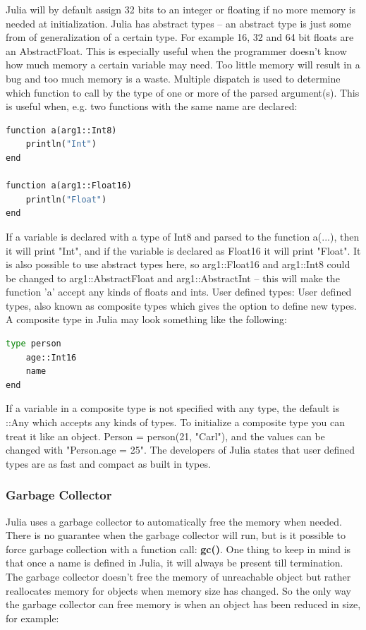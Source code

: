 \documentclass[a4paper,11pt]{article}
\begin{document}
Julia will by default assign 32 bits to an integer or floating if no more memory is needed at initialization. Julia has abstract types – an abstract type is just some from of generalization of a certain type. For example 16, 32 and 64 bit floats are an AbstractFloat. This is especially useful when the programmer doesn't know how much memory a certain variable may need. Too little memory will result in a bug and too much memory is a waste. Multiple dispatch is used to determine which function to call by the type of one or more of the parsed argument(s). This is useful when, e.g. two functions with the same name are declared:

\begin{lstlisting}[language=python]
function a(arg1::Int8)
	println("Int")  
end

function a(arg1::Float16)  
	println("Float")  
end    
\end{lstlisting}

If a variable is declared with a type of Int8 and parsed to the function a(...), then it will print "Int", and if the variable is declared as Float16 it will print "Float". It is also possible to use abstract types here, so arg1::Float16 and arg1::Int8 could be changed to arg1::AbstractFloat and arg1::AbstractInt – this will make the function 'a' accept any kinds of floats and ints.  
User defined types: User defined types, also known as composite types which gives the option to define new types. A composite type in Julia may look something like the following: 
\begin{lstlisting}[language=python]
type person 
	age::Int16 
	name 
end    
\end{lstlisting}
If a variable in a composite type is not specified with any type, the default is ::Any which accepts any kinds of types. To initialize a composite type you can treat it like an object. Person = person(21, "Carl"), and the values can be changed with "Person.age = 25". The developers of Julia states that user defined types are as fast and compact as built in types. 

\subsubsection{Garbage Collector}
Julia uses a garbage collector to automatically free the memory when needed. There is no guarantee when the garbage collector will run, but is it possible to force garbage collection with a function call: \textbf{gc()}. One thing to keep in mind is that once a name is defined in Julia, it will always be present till termination. The garbage collector doesn't free the memory of unreachable object but rather reallocates memory for objects when memory size has changed. So the only way the garbage collector can free memory is when an object has been reduced in size, for example:
\end{document}
